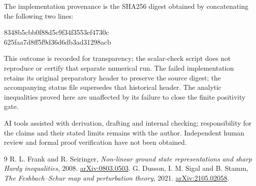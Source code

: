 \documentclass[11pt]{article}
\begin{document}
The implementation provenance is the SHA256 digest obtained by concatenating the following two lines:
\begin{center}\small\ttfamily
8348b5cbb0f88d5c9f34f3553ef4730c\\
625faa7d8ff5f9d36d6db3ad31298acb
\end{center}
This outcome is recorded for transparency; the scalar-check script does not reproduce or certify that separate numerical run. The failed implementation retains its original preparatory header to preserve the source digest; the accompanying status file supersedes that historical header. The analytic inequalities proved here are unaffected by its failure to close the finite positivity gate.

AI tools assisted with derivation, drafting and internal checking; responsibility for the claims and their stated limits remains with the author. Independent human review and formal proof verification have not been obtained.

\begin{thebibliography}{9}
 R. L. Frank and R. Seiringer, \emph{Non-linear ground state representations and sharp Hardy inequalities}, 2008. \href{https://arxiv.org/abs/0803.0503}{arXiv:0803.0503}.
 G. Dusson, I. M. Sigal and B. Stamm, \emph{The Feshbach--Schur map and perturbation theory}, 2021. \href{https://arxiv.org/abs/2105.02058}{arXiv:2105.02058}.
\end{thebibliography}
\end{document}
